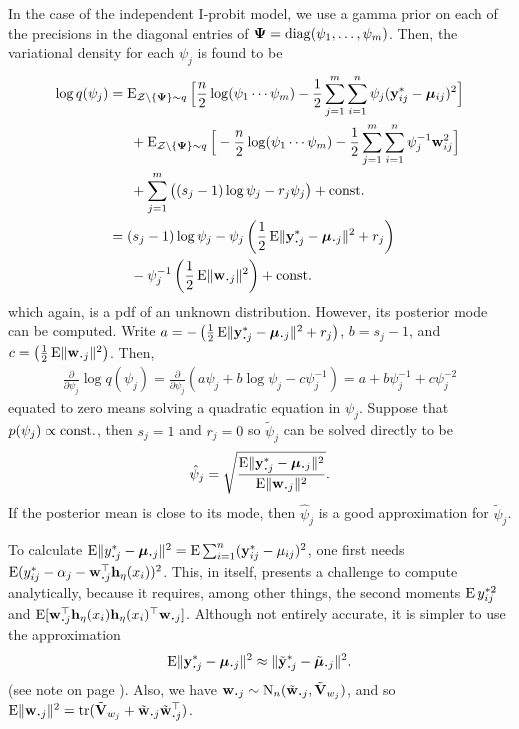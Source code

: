 In the case of the independent I-probit model, we use a gamma prior on each of the precisions in the diagonal entries of ${\bm\Psi}=\operatorname{diag}(\psi_1,\dots,\psi_m)$.
Then, the variational density for each $\psi_j$ is found to be
\begin{align*}
  \log  q(\psi_j)
  &= \E_{\cZ\backslash\{\bPsi\}\sim q} \Big[ 
  \half[n]\log (\psi_1\cdots\psi_m) - \half\sum_{j=1}^m \sum_{i=1}^n \psi_j(\by^*_{ij} - \bmu_{ij})^2 
  \Big] \\
  &\phantom{==} +\E_{\cZ\backslash\{\bPsi\}\sim q} \Big[ 
  -\half[n]\log (\psi_1\cdots\psi_m) - \half\sum_{j=1}^m \sum_{i=1}^n \psi_j^{-1} \bw_{ij}^2 
  \Big] \\
  &\phantom{==} + \sum_{j=1}^m \big( (s_j - 1)\log \psi_j - r_j\psi_j \big) + \const \\
  &= (s_j - 1)\log \psi_j 
  - \psi_j \left( \half \E\norm{\by_{\bigcdot j}^* -  \bmu_{\bigcdot j}}^2 +  r_j \right) \\
  &\phantom{==}
  - \psi_j^{-1} \left( \half\E\norm{\bw_{\bigcdot j}}^2  \right) + \const
\end{align*}
which again, is a pdf of an unknown distribution.
However, its posterior mode can be computed.
Write $a = -\left( \half \E\norm{\by_{\bigcdot j}^* -  \bmu_{\bigcdot j}}^2 + r_j \right)$,
$b = s_j - 1$, and $c=\left( \half\E\norm{\bw_{\bigcdot j}}^2  \right)$.
Then,
\begin{align*}
  \frac{\partial}{\partial\psi_j} \log q(\psi_j)
  = \frac{\partial}{\partial\psi_j} \left( a\psi_j + b\log \psi_j - c\psi_j^{-1} \right) 
  = a +b\psi_j^{-1} + c\psi_j^{-2} 
\end{align*}
equated to zero means solving a quadratic equation in $\psi_j$.
Suppose that $p(\psi_j) \propto \text{const.}\hspace{0.01em}$, then $s_j=1$ and $r_j = 0$ so $\tilde\psi_j$ can be solved directly to be
\[
  \hat\psi_j = \sqrt{\frac{ \E\norm{\by_{\bigcdot j}^* -  \bmu_{\bigcdot j}}^2 }{\E\norm{\bw_{\bigcdot j}}^2}}.
\]
If the posterior mean is close to its mode, then $\hat\psi_j$ is a good approximation for $\tilde\psi_j$.

To calculate $\E\norm{y_{\bigcdot j}^* -  \bmu_{\bigcdot j}}^2 = \E \sum_{i=1}^n (\by_{ij}^* - \mu_{ij})^2$, one first needs $\E (y_{ij}^* - \alpha_j - \bw_{\bigcdot j}^\top\bh_\eta(x_i))^2$.
This, in itself, presents a challenge to compute analytically, because it requires, among other things, the second moments $\operatorname{E} y_{ij}^{*2}$ and $\E [\bw_{\bigcdot j}^\top\bh_\eta(x_i)\bh_\eta(x_i)^\top \bw_{\bigcdot j}]$.
Although not entirely accurate, it is simpler to use the approximation
\[
  \E\norm{\by_{\bigcdot j}^* -  \bmu_{\bigcdot j}}^2 \approx 
  \norm{\tilde \by_{\bigcdot j}^* -  \tilde \bmu_{\bigcdot j}}^2.
\]
(see note  on page \pageref{note2}).
Also, we have $\bw_{\bigcdot j} \sim \N_n(\tilde\bw_{\bigcdot j}, \tilde\bV_{w_j})$, and so $  \E\norm{\bw_{\bigcdot j}}^2 = \tr(\tilde\bV_{w_j} + \tilde\bw_{\bigcdot j}\tilde\bw_{\bigcdot j}^\top)$.

